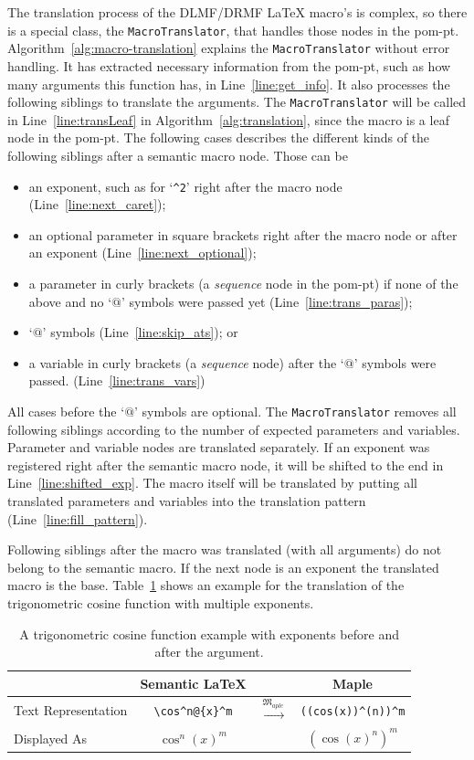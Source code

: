 \documentclass[a4paper,11pt]{article}
\newcommand{\DLMF}{DLMF}
\newcommand{\DRMF}{DRMF}
\newcommand{\Maple}{Maple}
\newcommand{\Macro}{\DLMF/\DRMF{} \LaTeX{} macro}
\newcommand{\langMaple}{\mathfrak{M}_{aple}}
\theoremstyle{defTheoStyle}
\theoremstyle{defExampStyle}
\begin{document}
The translation process of the \Macro 's is complex, so there is a special class, the \verb|MacroTranslator|, that handles those nodes in the \gls*{pom-pt}. Algorithm~\ref{alg:macro-translation} explains the \verb|MacroTranslator| without error handling. It has extracted necessary information from the \gls*{pom-pt}, such as how many arguments this function has, in Line~\ref{line:get_info}. It also processes the following siblings to translate the arguments. The \verb|MacroTranslator| will be called in Line~\ref{line:transLeaf} in Algorithm~\ref{alg:translation}, since the macro is a leaf node in the \gls*{pom-pt}. The following cases describes the different kinds of the following siblings after a semantic macro node. Those can be
\begin{itemize}
\item an exponent, such as for `\verb|^2|' right after the macro node (Line~\ref{line:next_caret});
\item an optional parameter in square brackets right after the macro node or after an exponent (Line~\ref{line:next_optional});
\item a parameter in curly brackets (a \textit{sequence} node in the \gls*{pom-pt}) if none of the above and no `$@$' symbols were passed yet (Line~\ref{line:trans_paras});
\item `$@$' symbols (Line~\ref{line:skip_ats}); or
\item a variable in curly brackets (a \textit{sequence} node) after the `$@$' symbols were passed. (Line~\ref{line:trans_vars})
\end{itemize}

All cases before the `$@$' symbols are optional. The \verb|MacroTranslator| removes all following siblings according to the number of expected parameters and variables. Parameter and variable nodes are translated separately. If an exponent was registered right after the semantic macro node, it will be shifted to the end in Line~\ref{line:shifted_exp}. The macro itself will be translated by putting all translated parameters and variables into the translation pattern (Line~\ref{line:fill_pattern}).

Following siblings after the macro was translated (with all arguments) do not belong to the semantic macro. If the next node is an exponent the translated macro is the base. Table~\ref{tab:multi-expo} shows an example for the translation of the trigonometric cosine function with multiple exponents.

\begin{table}[ht]
\centering
\begin{tabular}{lccc}
 & Semantic \LaTeX & & \Maple{} \\
\hline
Text Representation & \rule{0pt}{1.0\normalbaselineskip} \verb|\cos^n@{x}^m| & $\overset{\langMaple}{\mapsto}$ & \verb|((cos(x))^(n))^m| \\
Displayed As & \rule{0pt}{1.0\normalbaselineskip} $\cos^n(x)^m$ & & $\left( \cos(x)^n \right)^m$ \\
\hline
\end{tabular}
\caption{A trigonometric cosine function example with exponents before and after the argument.}
\label{tab:multi-expo}
\end{table}
\end{document}

